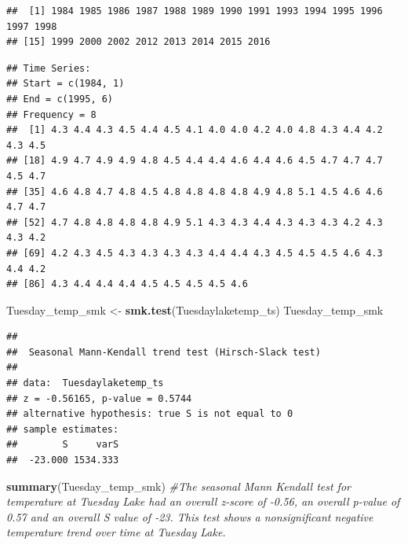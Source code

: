 \documentclass[12pt,]{article}
\newenvironment{Shaded}{\begin{snugshade}}{\end{snugshade}}
\newcommand{\KeywordTok}[1]{\textcolor[rgb]{0.13,0.29,0.53}{\textbf{#1}}}
\newcommand{\DataTypeTok}[1]{\textcolor[rgb]{0.13,0.29,0.53}{#1}}
\newcommand{\DecValTok}[1]{\textcolor[rgb]{0.00,0.00,0.81}{#1}}
\newcommand{\StringTok}[1]{\textcolor[rgb]{0.31,0.60,0.02}{#1}}
\newcommand{\CommentTok}[1]{\textcolor[rgb]{0.56,0.35,0.01}{\textit{#1}}}
\newcommand{\OperatorTok}[1]{\textcolor[rgb]{0.81,0.36,0.00}{\textbf{#1}}}
\newcommand{\NormalTok}[1]{#1}
\begin{document}
\begin{verbatim}
##  [1] 1984 1985 1986 1987 1988 1989 1990 1991 1993 1994 1995 1996 1997 1998
## [15] 1999 2000 2002 2012 2013 2014 2015 2016
\end{verbatim}

\begin{Shaded}
\end{Shaded}

\begin{verbatim}
## Time Series:
## Start = c(1984, 1) 
## End = c(1995, 6) 
## Frequency = 8 
##  [1] 4.3 4.4 4.3 4.5 4.4 4.5 4.1 4.0 4.0 4.2 4.0 4.8 4.3 4.4 4.2 4.3 4.5
## [18] 4.9 4.7 4.9 4.9 4.8 4.5 4.4 4.4 4.6 4.4 4.6 4.5 4.7 4.7 4.7 4.5 4.7
## [35] 4.6 4.8 4.7 4.8 4.5 4.8 4.8 4.8 4.8 4.9 4.8 5.1 4.5 4.6 4.6 4.7 4.7
## [52] 4.7 4.8 4.8 4.8 4.8 4.9 5.1 4.3 4.3 4.4 4.3 4.3 4.3 4.2 4.3 4.3 4.2
## [69] 4.2 4.3 4.5 4.3 4.3 4.3 4.3 4.4 4.4 4.3 4.5 4.5 4.5 4.6 4.3 4.4 4.2
## [86] 4.3 4.4 4.4 4.4 4.5 4.5 4.5 4.5 4.6
\end{verbatim}

\begin{Shaded}
\begin{Highlighting}[]
\NormalTok{Tuesday_temp_smk <-}\StringTok{ }\KeywordTok{smk.test}\NormalTok{(Tuesdaylaketemp_ts)}
\NormalTok{Tuesday_temp_smk}
\end{Highlighting}
\end{Shaded}

\begin{verbatim}
## 
##  Seasonal Mann-Kendall trend test (Hirsch-Slack test)
## 
## data:  Tuesdaylaketemp_ts
## z = -0.56165, p-value = 0.5744
## alternative hypothesis: true S is not equal to 0
## sample estimates:
##        S     varS 
##  -23.000 1534.333
\end{verbatim}

\begin{Shaded}
\begin{Highlighting}[]
\KeywordTok{summary}\NormalTok{(Tuesday_temp_smk) }\CommentTok{#The seasonal Mann Kendall test for temperature at Tuesday Lake had an overall z-score of -0.56, an overall p-value of 0.57 and an overall S value of -23. This test shows a nonsignificant negative temperature trend over time at Tuesday Lake.}
\end{Highlighting}
\end{Shaded}
\end{document}
